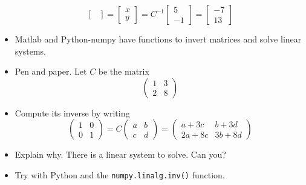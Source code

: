\documentclass[8pt]{beamer}
\begin{document}
\begin{frame}
\begin{itemize}
$$\begin{bmatrix}
    \end{bmatrix}
    =
    \begin{bmatrix}
      x \\ y
    \end{bmatrix}
    =
    C^{-1}
    \begin{bmatrix}
      5\\-1
    \end{bmatrix} =
    \begin{bmatrix}
      -7\\13
    \end{bmatrix}
    $$
  \item Matlab and Python-numpy have functions to invert matrices and solve linear systems.
  \end{itemize}
\end{frame}




\begin{exercise}
  \begin{itemize}
  \item Pen and paper. Let $C$ be the matrix
    $$
    \begin{pmatrix}
      1 & 3\\
      2 & 8
    \end{pmatrix}
    $$
  \item Compute its inverse by writing
    $$
    \begin{pmatrix}
      1 & 0\\
      0 & 1
    \end{pmatrix} =
    C
    \begin{pmatrix}
      a & b\\
      c & d
    \end{pmatrix}
    =
    \begin{pmatrix}
      a + 3c & b + 3d\\
      2a + 8c& 3b + 8d
    \end{pmatrix}
    $$
  \item Explain why. There is a linear system to solve. Can you?
  \item Try with Python and the \texttt{numpy.linalg.inv()} function.
  \end{itemize}
\end{exercise}
\end{document}
